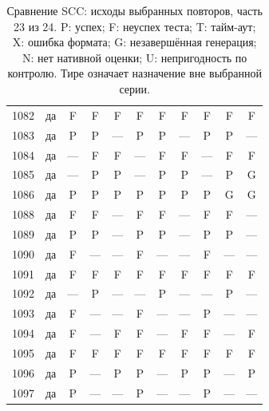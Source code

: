 \begin{table}[p]
\begin{tabular*}{\textwidth}{@{\extracolsep{\fill}}rc*{9}{c}@{}}
1082 & да & F & F & F & F & F & F & F & F & F\\
1083 & да & P & P & — & P & P & — & P & P & —\\
1084 & да & — & F & F & — & F & F & — & F & F\\
1085 & да & — & P & P & — & P & P & — & P & G\\
1086 & да & P & P & P & P & P & P & P & G & G\\
1088 & да & F & F & — & F & F & — & F & F & —\\
1089 & да & P & P & — & P & P & — & P & P & —\\
1090 & да & F & — & — & F & — & — & F & — & —\\
1091 & да & F & F & F & F & F & F & F & F & F\\
1092 & да & — & P & — & — & P & — & — & P & —\\
1093 & да & F & — & — & F & — & — & P & — & —\\
1094 & да & F & — & F & F & — & F & F & — & F\\
1095 & да & F & F & F & F & F & F & F & F & F\\
1096 & да & P & — & P & P & — & P & P & — & P\\
1097 & да & P & — & — & P & — & — & P & — & —\\
\bottomrule\end{tabular*}
\caption{Сравнение SCC: исходы выбранных повторов, часть 23 из 24. P: успех; F: неуспех теста; T: тайм-аут; X: ошибка формата; G: незавершённая генерация; N: нет нативной оценки; U: непригодность по контролю. Тире означает назначение вне выбранной серии.}
\end{table}
\clearpage
